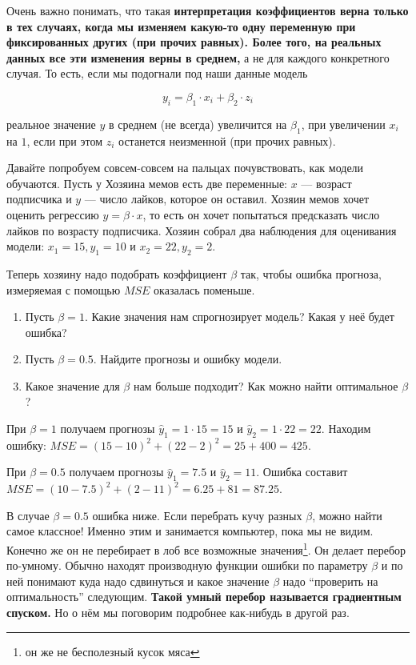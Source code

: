 \documentclass[12pt, a4paper, oneside]{article}
\theoremstyle{plain} %
\theoremstyle{definition}
\newcounter{problem}%
\renewcommand{\theproblem}{\arabic{problem}}
\newenvironment{problem}[1]{
\addtocounter{problem}{1}\noindent{ \color{titleblue} \large \bfseries Упражнение~\theproblem~#1 \vspace{1ex} \newline}
}{ }
\newcommand{\indef}[1]{\textbf{ \color{green} #1}}
\begin{document}
\begin{solution}
	Очень важно понимать, что такая \indef{интерпретация коэффициентов верна только в тех случаях, когда мы изменяем какую-то одну переменную при фиксированных других (при прочих равных). Более того, на реальных данных все эти изменения верны в среднем,} а не для каждого конкретного случая. То есть, если мы подогнали под наши данные модель 
	
	\[ y_i = \beta_1 \cdot  x_i + \beta_2 \cdot  z_i \]
	
	реальное значение $y$ в среднем (не всегда) увеличится на $\beta_1$, при увеличении $x_i$ на $1$, если при этом $z_i$ останется неизменной (при прочих равных).
\end{solution}

\begin{problem}{(как обучаются модели)}
Давайте попробуем совсем-совсем на пальцах почувствовать, как модели обучаются. Пусть у Хозяина мемов есть две переменные: $x$ --- возраст подписчика и $y$ --- число лайков, которое он оставил. Хозяин мемов хочет оценить регрессию $y = \beta \cdot x$, то есть он хочет попытаться предсказать число лайков по возрасту подписчика. Хозяин собрал два наблюдения для оценивания модели: $x_1 = 15, y_1 = 10$ и $x_2 = 22, y_2 = 2$.

Теперь хозяину надо подобрать коэффициент $\beta$ так, чтобы ошибка прогноза, измеряемая с помощью $MSE$ оказалась поменьше. 

\begin{enumerate} 
	\item  Пусть $\beta = 1$. Какие значения нам спрогнозирует модель? Какая у неё будет ошибка? 
	\item Пусть $\beta = 0.5$. Найдите прогнозы и ошибку модели.
	\item  Какое значение для $\beta$ нам больше подходит? Как можно найти оптимальное $\beta$? 
\end{enumerate}  
\end{problem} 

\begin{solution}
	При $\beta = 1$ получаем прогнозы $\hat y_1 = 1 \cdot 15 = 15$ и  $\hat y_2 = 1 \cdot 22 = 22$. Находим ошибку: $MSE = (15 - 10)^2 + (22 - 2)^2 = 25 + 400 = 425$. 
	
	При $\beta = 0.5$ получаем прогнозы $\hat y_1 = 7.5$ и $\hat y_2 = 11$. Ошибка составит $MSE = (10 - 7.5)^2 + (2 - 11)^2 = 6.25 + 81 = 87.25$. 
	
	В случае $\beta = 0.5$ ошибка ниже. Если перебрать кучу разных $\beta$, можно найти самое классное! Именно этим и занимается компьютер, пока мы не видим. Конечно же он не перебирает в лоб все возможные значения\footnote{он же не бесполезный кусок мяса}. Он делает перебор по-умному. Обычно находят производную функции ошибки по параметру $\beta$ и по ней понимают куда надо сдвинуться и какое значение $\beta$ надо ``проверить на оптимальность'' следующим. \indef{Такой умный перебор называется градиентным спуском.}  Но о нём мы поговорим подробнее как-нибудь в другой раз.
\end{solution}
\end{document}
